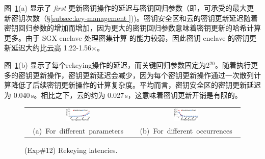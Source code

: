 图~\ref{fig:rekeyingLatency}(a) 显示了 {\em first} 更新密钥操作的延迟与密钥回归参数（即，可承受的最大更新密钥次数（\S\ref{subsec:key-management }))。密钥安全区和云的密钥更新延迟随着密钥回归参数的增加而增加，因为更大的密钥回归参数意味着密钥更新的哈希计算更多。由于 SGX enclave 处理密集计算 \cite{harnik18} 的能力较弱，因此密钥 enclave 的密钥更新延迟大约比云高 1.22-1.56$\times$。

图~\ref{fig:rekeyingLatency}(b) 显示了每个rekeying操作的延迟，而关键回归参数固定为2$^{20}$。随着执行更多的密钥更新操作，密钥更新延迟会减少，因为每个密钥更新操作通过一次散列计算降低了后续密钥更新操作的计算复杂度。平均而言，密钥安全区的密钥更新延迟为 0.040\,s。相比之下，云的约为 0.027\,s，这意味着密钥更新开销是有限的。

\begin{figure}[t]
\centering
\begin{tabular}{@{\ }c@{\ }c}
\includegraphics[width=0.24\textwidth]{pic/sgxdedup/expa5_keyRegression_time.pdf} &
\includegraphics[width=0.24\textwidth]{pic/sgxdedup/expa5_keyRegression_time_default.pdf} \\
\mbox{\small (a) For different parameters} &
\mbox{\small (b) For different occurrences}
\end{tabular}
\caption{(Exp\#12) Rekeying latencies.}
\label{fig:rekeyingLatency}
\end{figure}
